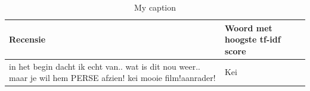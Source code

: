 \begin{appendices}
\begin{table}[]
\centering
\caption{My caption}
\label{my-label}
\begin{tabu} to \textwidth {|X|X|}
\hline
{\bf Recensie}                                                                                                                                                                                                                                                                                                                                                                                                                                                                                                                                                                                                                                                                                                                                                                                                                                                                                                                                                                                                                                                                                                                                                                                                                                                                                                                                                                                                                                                                                  & {\bf Woord met hoogste tf-idf score} \\ \hline
in het begin dacht ik echt van.. wat is dit nou weer.. maar je wil hem PERSE afzien! kei mooie film!aanrader!                                                                                                                                                                                                                                                                                                                                                                                                                                                                                                                                                                                                                                                                                                                                                                                                                                                                                                                                                                                                                                                                                                                                                                                                                                                                                                                                                                                   & Kei                                  \\ \hline

\end{tabu}
\end{table}
\end{appendices}
